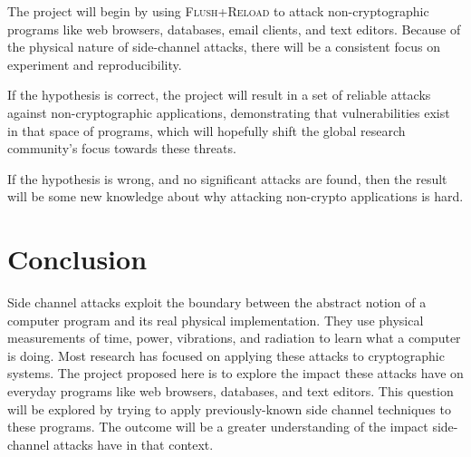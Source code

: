 \documentclass{acm_proc_article-sp}
\begin{document}
The project will begin by using \textsc{Flush+Reload} to attack
non-cryptographic programs like web browsers, databases, email clients, and text
editors. Because of the physical nature of side-channel attacks, there will be
a consistent focus on experiment and reproducibility.

If the hypothesis is correct, the project will result in a set of reliable
attacks against non-cryptographic applications, demonstrating that
vulnerabilities exist in that space of programs, which will hopefully shift the
global research community's focus towards these threats.

If the hypothesis is wrong, and no significant attacks are found, then the
result will be some new knowledge about why attacking non-crypto applications is
hard.

\section{Conclusion}
\label{sec:conclusion}

Side channel attacks exploit the boundary between the abstract notion of
a computer program and its real physical implementation. They use physical
measurements of time, power, vibrations, and radiation to learn what a computer
is doing. Most research has focused on applying these attacks to cryptographic
systems. The project proposed here is to explore the impact these attacks have
on everyday programs like web browsers, databases, and text editors. This
question will be explored by trying to apply previously-known side channel
techniques to these programs. The outcome will be a greater understanding of the
impact side-channel attacks have in that context.



\end{document}
